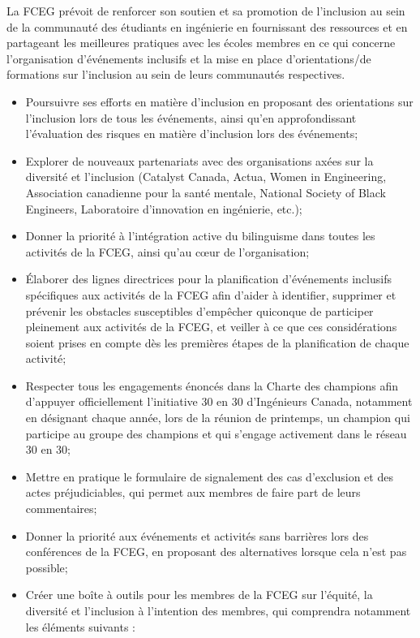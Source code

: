 
La FCEG prévoit de renforcer son soutien et sa promotion de l'inclusion au sein de la communauté des étudiants en ingénierie en fournissant des ressources et en partageant les meilleures pratiques avec les écoles membres en ce qui concerne l'organisation d'événements inclusifs et la mise en place d'orientations/de formations sur l'inclusion au sein de leurs communautés respectives.

\begin{itemize}
 \item Poursuivre ses efforts en matière d'inclusion en proposant des orientations sur l'inclusion lors de tous les événements, ainsi qu'en approfondissant l'évaluation des risques en matière d'inclusion lors des événements;
 \item Explorer de nouveaux partenariats avec des organisations axées sur la diversité et l'inclusion (Catalyst Canada, Actua, Women in Engineering, Association canadienne pour la santé mentale, National Society of Black Engineers, Laboratoire d'innovation en ingénierie, etc.);
 \item Donner la priorité à l'intégration active du bilinguisme dans toutes les activités de la FCEG, ainsi qu'au cœur de l'organisation;
 \item Élaborer des lignes directrices pour la planification d'événements inclusifs spécifiques aux activités de la FCEG afin d'aider à identifier, supprimer et prévenir les obstacles susceptibles d'empêcher quiconque de participer pleinement aux activités de la FCEG, et veiller à ce que ces considérations soient prises en compte dès les premières étapes de la planification de chaque activité;
 \item Respecter tous les engagements énoncés dans la Charte des champions afin d'appuyer officiellement l'initiative 30 en 30 d'Ingénieurs Canada, notamment en désignant chaque année, lors de la réunion de printemps, un champion qui participe au groupe des champions et qui s'engage activement dans le réseau 30 en 30;
 \item Mettre en pratique le formulaire de signalement des cas d'exclusion et des actes préjudiciables, qui permet aux membres de faire part de leurs commentaires;
 \item Donner la priorité aux événements et activités sans barrières lors des conférences de la FCEG, en proposant des alternatives lorsque cela n'est pas possible;
 \item Créer une boîte à outils pour les membres de la FCEG sur l'équité, la diversité et l'inclusion à l'intention des membres, qui comprendra notamment les éléments suivants :

\end{itemize}
